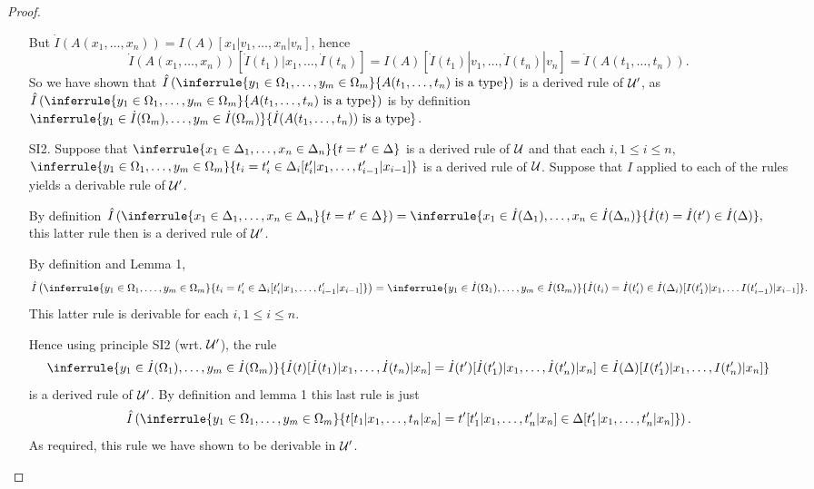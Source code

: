 \begin{proof}
\begin{enumerate}
  But $\dot I(A(x_1,\ldots,x_n))=I(A)[x_1|v_1,\ldots,x_n|v_n]$, hence 
\[\dot I(A(x_1,\ldots,x_n))[\dot I(t_1)|x_1,\ldots,\dot I(t_n)] = I(A)[\dot I(t_1)|v_1,\ldots,\dot I(t_n)|v_n] = \dot I(A(t_1,\ldots,t_n)).\]
%
 So we have shown that $\hat I\left(\inferrule{y_1\in\Omega_1,\ldots,y_m\in\Omega_m}{A(t_1,\ldots,t_n)\isatype}\right)$ is a derived rule of $\mathcal{U}'$, as $\hat I\left(\inferrule{y_1\in\Omega_1,\ldots,y_m\in\Omega_m}{A(t_1,\ldots,t_n)\isatype}\right)$ is by definition $\inferrule{y_1\in\dot I(\Omega_m),\ldots,y_m\in\dot I(\Omega_m)}{\dot I(A(t_1,\ldots,t_n))\isatype}$.

  \item[SI2.] Suppose that $\inferrule{x_1\in\Delta_1,\ldots,x_n\in\Delta_n}{t=t'\in\Delta}$ is a derived rule of $\mathcal{U}$ and that each $i,1\leq i\leq n,$ $\inferrule{y_1\in\Omega_1,\ldots,y_m\in\Omega_m}{t_i=t_i'\in\Delta_i[t_i'|x_1,\ldots,t_{i-1}'|x_{i-1}]}$ is a derived rule of $\mathcal{U}$.
%
 Suppose that $\hat I$ applied to each of the rules yields a derivable rule of $\mathcal{U}'$.

By definition $\hat I\left(\inferrule{x_1\in\Delta_1,\ldots,x_n\in\Delta_n}{t=t'\in\Delta}\right) = \inferrule{x_1\in\dot I(\Delta_1),\ldots,x_n\in\dot I(\Delta_n)}{\dot I(t)=\dot I(t')\in\dot I(\Delta)},$ this latter rule then is a derived rule of $\mathcal{U}'$.

By definition and Lemma 1, 
\[\hat I\left (\inferrule{y_1\in\Omega_1,\ldots,y_m\in\Omega_m}{t_i=t_i'\in\Delta_i[t_i'|x_1,\ldots,t_{i-1}'|x_{i-1}]}\right)
=\inferrule{y_1\in\dot I(\Omega_1),\ldots,y_m\in\dot I(\Omega_m)}{\dot I(t_i) = \dot I(t_i')\in\dot I(\Delta_i)[I(t_1')|x_1,\ldots I(t_{i-1}')|x_{i-1}]}.\]
%
 This latter rule is derivable for each $i,1\leq i\leq n$.

Hence using principle SI2 (wrt. $\mathcal{U}'$), the rule
\[\inferrule{y_1\in\dot I(\Omega_1),\ldots,y_m\in\dot I(\Omega_m)}{\dot I(t)[\dot I(t_1)|x_1,\ldots,\dot I(t_n)|x_n] = \dot I(t')[\dot I(t_1')|x_1,\ldots,\dot I(t_n')|x_n]\in\dot I(\Delta)[I(t_1')|x_1,\ldots,I(t_n')|x_n]}\]
is a derived rule of $\mathcal{U}'$.
%
By definition and lemma 1 this last rule is just
\[\hat I\left(\inferrule{y_1\in\Omega_1,\ldots,y_m\in\Omega_m}{t[t_1|x_1,\ldots,t_n|x_n]=t'[t_1'|x_1,\ldots,t_n'|x_n]\in\Delta[t_1'|x_1,\ldots,t_n'|x_n]}\right).\]
As required, this rule we have shown to be derivable in $\mathcal{U}'$.
\end{enumerate}
\end{proof}

